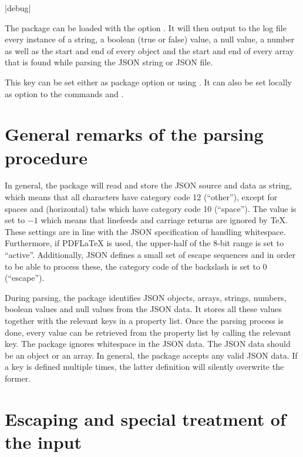 \documentclass[a4paper]{article}
\begin{document}
\begin{macrodef}
|debug|
\end{macrodef}
The package can be loaded with the option . It will then output to the log file every instance of a string, a boolean (true or false) value, a null value, a number as well as the start and end of every object and the start and end of every array that is found while parsing the JSON string or JSON file.

This key can be set either as package option or using \macro{\JSONParseSet}. It can also be set locally as option to the commands \macro{\JSONParse} and \macro{\JSONParseFromFile}.

\section{General remarks of the parsing procedure}

In general, the package will read and store the JSON source and data as string, which means that all characters have category code 12 (``other''), except for spaces and (horizontal) tabs which have category code 10 (``space''). The \macro{\endlinechar} value is set to $-1$ which means that linefeeds and carriage returns are ignored by TeX. These settings are in line with the JSON specification of handling whitespace. Furthermore, if PDFLaTeX is used, the upper-half of the 8-bit range is set to ``active''. Additionally, JSON defines a small set of escape sequences and in order to be able to process these, the category code of the backslash is set to 0 (``escape'').

During parsing, the package identifies JSON objects, arrays, strings, numbers, boolean values and null values from the JSON data. It stores all these values together with the relevant keys in a property list. Once the parsing process is done, every value can be retrieved from the property list by calling the relevant key. The package ignores whitespace in the JSON data. The JSON data should be an object or an array. In general, the package accepts any valid JSON data. If a key is defined multiple times, the latter definition will silently overwrite the former.

\section{Escaping and special treatment of the input}\label{sec:escaping}
\end{document}
